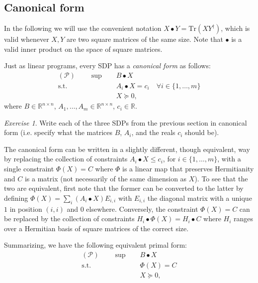\documentclass[11pt, letterpaper]{article}
\theoremstyle{remark}
\newtheorem{exercise}[theorem]{Exercise}
\theoremstyle{definition}
\numberwithin{equation}{section}
\newcommand{\1}{\mathbb{1}}
\newcommand{\R}{\ensuremath{\mathds{R}}}
\newcommand{\Tr}{\mathrm{Tr}}
\begin{document}
\subsection{Canonical form}
 
In the following we will use the convenient notation $X\bullet Y = \Tr(XY^\dagger)$, which is valid whenever $X,Y$ are two square matrices of the same size. Note that $\bullet$ is a valid inner product on the space of square matrices. 

Just as linear programs, every SDP has a \emph{canonical form} as follows: 
\begin{align}
(\mathcal{P})\qquad\sup \quad & B\bullet X \label{eq:sdp-primal}\\
\text{s.t.}\quad & A_i\bullet X = c_i\quad\forall i\in\{1,\ldots,m\} \nonumber\\
& X\succeq 0, \nonumber
\end{align}
where $B\in \R^{n\times n}$, $A_1,\ldots,A_m\in \R^{n\times n}$, $c_i\in\R$.

\begin{exercise}
Write each of the three SDPs from the previous section in canonical form (i.e. specify what the matrices $B$, $A_i$, and the reals $c_i$ should be).
\end{exercise}

The canonical form can be written in a slightly different, though equivalent, way by replacing the collection of constraints $A_i\bullet X \leq c_i$, for $i\in\{1,\ldots,m\}$, with a single constraint $\Phi(X)=C$ where $\Phi$ is a linear map that preserves Hermitianity and $C$ is a matrix (not necessarily of the same dimension as $X$). To see that the two are equivalent, first note that the former can be converted to the latter by defining $\Phi(X) = \sum_i (A_i\bullet X) E_{i,i}$ with $E_{i,i}$ the diagonal matrix with a unique $1$ in position $(i,i)$ and $0$ elsewhere. Conversely, the constraint $\Phi(X)=C$ can be replaced by the collection of constraints $H_i\bullet\Phi(X)=H_i\bullet C$ where $H_i$ ranges over a Hermitian basis of square matrices of the correct size.  

Summarizing, we have the following equivalent primal form: 
\begin{align}
(\mathcal{P})\qquad\sup \quad & B\bullet X \label{eq:sdp-primal-2}\\
\text{s.t.}\quad & \Phi(X) = C \nonumber\\
& X\succeq 0, \nonumber
\end{align}
\end{document}

